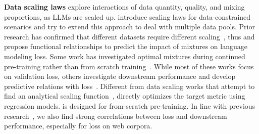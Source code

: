\textbf{Data scaling laws} explore interactions of data quantity, quality, and mixing proportions, as LLMs are scaled up. \citet{muennighoff2023scaling} introduce scaling laws for data-constrained scenarios and \citet{goyal2024scaling} try to extend this approach to deal with multiple data pools. Prior research has confirmed that different datasets require different scaling~\citep{hoffmann2022training,pandey2024gzip}, thus \citet{ye2024datamixing} and \citet{ge2024data} propose functional relationships to predict the impact of mixtures on language modeling loss. Some work has investigated optimal mixtures during continued pre-training rather than from scratch training~\citep{que2024dcpt,dou2024sailor}. While most of these works focus on validation loss, others investigate downstream performance and develop predictive relations with loss~\citep{gadre2024language,yang2024fine,xia2022training}.
Different from data scaling works that attempt to find an analytical scaling function~\citep{hoffmann2022training}, \ourmethod directly optimizes the target metric using regression models.
\ourmethod is designed for from-scratch pre-training. In line with previous research~\citep{huang2024compression}, we also find strong correlations between loss and downstream performance, especially for loss on web corpora.
